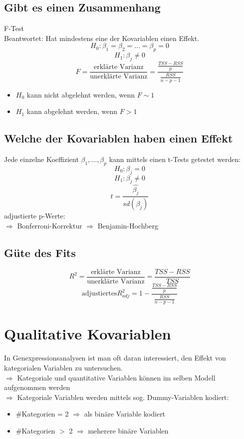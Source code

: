 \documentclass[10pt]{report}
\theoremstyle{definition}
\begin{document}
\subsection{Gibt es einen Zusammenhang} F-Test\\
Beantwortet: Hat mindestens eine der Kovariablen einen Effekt.
\[ H_0: \beta_1=\beta_2=\dots=\beta_p=0 \]
\[ H_1: \beta_j \neq 0 \]
\[F= \frac{\text{erklärte Varianz}}{\text{unerklärte Varianz}} = \frac{\frac{TSS - RSS}{p}}{\frac{RSS}{n-p-1}} \]
\begin{itemize}
	\item $H_0$ kann nicht abgelehnt werden, wenn $F \sim 1$
	\item $H_1$ kann abgelehnt werden, wenn $F > 1$
\end{itemize}

\subsection{Welche der Kovariablen haben einen Effekt}
Jede einzelne Koeffizient $\beta_1,\dots,\beta_p$ kann mittels einen t-Tests getestet werden:
\[ H_0: \beta_j = 0 \]
\[H_1: \beta_j \neq 0 \]
\[ t= \frac{\hat{\beta_j}}{sd(\beta_j)} \]
adjustierte p-Werte: \\
$\Rightarrow$ Bonferroni-Korrektur
$\Rightarrow$ Benjamin-Hochberg

\subsection{Güte des Fits}
\[ R^{2} = \frac{\text{erklärte Varianz}}{\text{unerklärte Varianz}} = \frac{TSS -RSS}{TSS} \]
\[ \text{adjustiertes} R_{adj}^{2} = 1 - \frac{\frac{TSS - RSS}{p}}{\frac{RSS}{n-p-1}} \]

\section{Qualitative Kovariablen}
In Genexpressionsanalysen ist man oft daran interessiert, den Effekt von kategorialen Variablen zu untersuchen.\\
$\Rightarrow$ Kategoriale und quantitative Variablen können im selben Modell aufgenommen werden \\
$\Rightarrow$ Kategoriale Variablen werden mittels sog. Dummy-Variablen kodiert:
	\begin{itemize}
		\item \#Kategorien = 2 $\Rightarrow$ als binäre Variable kodiert
		\item \#Kategorien $>$ 2 $\Rightarrow$ meherere binäre Variablen
	\end{itemize}
\end{document}

